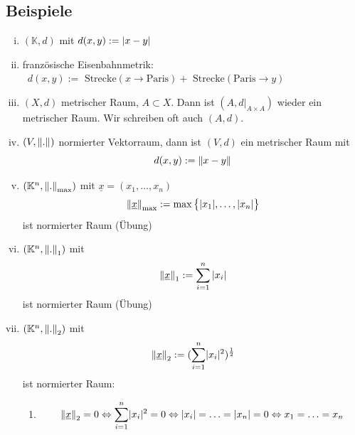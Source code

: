 \subsection[Beispiele für metrische Räume]{Beispiele} %
\label{sub:22}
\begin{enumerate}[(i)]
	\item $(\mathds{K},d)$ mit $d(x,y) := \lvert x-y\rvert $
	\item \glqq französische Eisenbahnmetrik\grqq : $\enspace d(x,y) := \text{ Strecke}(x \to \text{Paris}) + \text{ Strecke}(\text{Paris} \to y)$
	\begin{figure}[h]
	\end{figure}
	\item $(X,d)$ metrischer Raum, $A \subset X$. Dann ist $(A,d|_{A \times A})$ wieder ein metrischer Raum. Wir schreiben oft auch $(A,d)$.
	\item $(V, \norm[]{.} )$ normierter Vektorraum, dann ist $(V,d)$ ein metrischer Raum mit 
	\[
		d(x,y) := \norm[]{x-y} 
	\]
	\item $\enbrace{\mathds{K}^n, \norm[\max]{.}}$ mit $\underline{x}=(x_1, \ldots , x_n)$ 
	\[
		\norm[\max]{\underline{x}} := \max \big\{ |x_1| , \ldots , |x_n|\big\}
	\]
	ist normierter Raum \hfill(Übung)
	\item $\enbrace{\mathds{K}^n, \norm[1]{.} } $ mit 
	\[
		\norm[1]{\underline{x}} := \sum_{i=1}^{n} |x_i| 
	\] 
	ist normierter Raum \hfill (Übung)
	\item $\enbrace{\mathds{K}^n, \norm[2]{.} } $ mit 
	\[
		\norm[2]{\underline{x}} := \enbrace{\sum_{i=1}^{n} \abs{x_i}^2}^{\frac{1}{2} }  
	\]
	ist normierter Raum:
	\begin{enumerate}[1.]
		\item \[
			\norm[2]{\underline{x}} = 0 \Leftrightarrow \sum_{i=1}^{n} \abs{x_i}^2 = 0 \Leftrightarrow \abs{x_i} = \ldots = \abs{x_n} = 0  \Leftrightarrow x_1 = \ldots = x_n
\]
\end{enumerate}
\end{enumerate}
